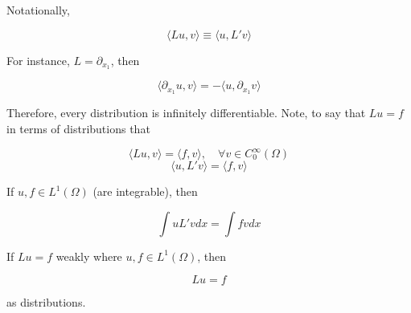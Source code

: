 \documentclass{article}
\newtheorem{one minute paper}[theorem]{One Minute Paper}
\begin{document}
Notationally, 

\begin{equation}
    \langle Lu, v \rangle \equiv \langle u, L' v \rangle
\end{equation}

For instance, $L = \partial_{x_1}$, then 

\begin{equation}
    \langle \partial_{x_1} u , v \rangle = -\langle u, \partial_{x_1}v \rangle
\end{equation}

Therefore, every distribution is infinitely differentiable. Note, to say that $Lu = f$ in terms of distributions that 

\begin{equation}
    \langle Lu, v \rangle = \langle f, v \rangle, \quad \forall v \in C_0^{\infty}\left( \Omega \right)
\end{equation}
\begin{equation}
    \langle u, L' v \rangle = \langle f, v \rangle
\end{equation}

If $u,f \in L^1(\Omega)$ (are integrable), then 

\begin{equation}
    \int u L' v dx = \int fv dx
\end{equation} 

If $Lu = f$ weakly where $u, f \in L^1(\Omega)$, then 

\begin{equation}
    Lu = f
\end{equation}

as distributions. 
\end{document}
